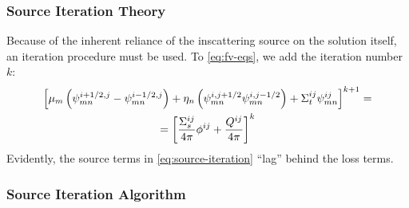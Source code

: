 \begin{frame}
  \frametitle{Source Iteration Theory}
  Because of the inherent reliance of the inscattering source on the solution itself, an iteration procedure must be used.
  To \cref{eq:fv-eqs}, we add the iteration number $k$:
  \begin{multline}\label{eq:source-iteration}
    \left[ \mu_{m}\left(\psi_{mn}^{i+1/2,j}-\psi_{mn}^{i-1/2,j}\right)+\eta_{n}\left(\psi_{mn}^{i,j+1/2}\-\psi_{mn}^{i,j-1/2}\right) + \Sigma_t ^{ij}\psi_{mn}^{ij}\right]^{k+1} =\\=\left[ \frac{\Sigma_s^{ij}}{4\pi}\phi^{ij} + \frac{Q^{ij}}{4\pi}\right]^k
  \end{multline}
  Evidently, the source terms in \cref{eq:source-iteration} ``lag'' behind the loss terms.
\end{frame}

\begin{frame}
  \frametitle{Source Iteration Algorithm}
  

\end{frame}
